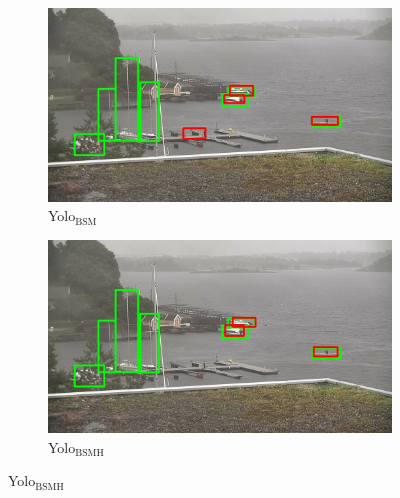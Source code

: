 \begin{figure}[h!]
\begin{subfigure}{.5\textwidth}
  \centering
  \includegraphics[width=0.9\linewidth]{results/case_buildings/yolo23/grove/yolo2/selected_08_09_frame8590.jpg}
  \caption{Yolo$_{\text{BSM}}$}
\end{subfigure}%
\begin{subfigure}{.5\textwidth}
  \centering
  \includegraphics[width=.9\linewidth]{results/case_buildings/yolo23/grove/yolo3/selected_08_09_frame8590.jpg}
  \caption{Yolo$_{\text{BSMH}}$}
\end{subfigure}


\end{figure}

